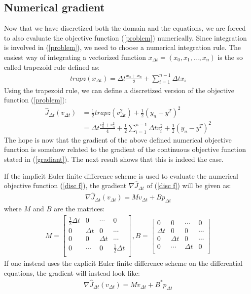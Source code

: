 \subsection{Numerical gradient}
Now that we have discretized both the domain and the equations, we are forced to also evaluate the objective function (\ref{problem}) numerically. Since integration is involved in (\ref{problem}), we need to choose a numerical integration rule. The easiest way of integrating a vectorized function $x_{\Delta t} = (x_0,x_1,...,x_n)$ is the so called trapezoid rule defined as:
\begin{align}
trapz(x_{\Delta t})=\Delta t\frac{x_0+x_n}{2} +\sum_{i=1}^{n-1} \Delta t x_i \label{trap}
\end{align}
Using the trapezoid rule, we can define a discretized version of the objective function (\ref{problem}):
\begin{align}
\hat J_{\Delta t}(v_{\Delta t})&=\frac{1}{2} trapz(v_{\Delta t}^2)+ \frac{1}{2}(y_n-y^T)^2 \\
&=\Delta t\frac{v_0^2+v_n^2}{4} + \frac{1}{2}\sum_{i=1}^{n-1} \Delta t v_i^2 + \frac{1}{2}(y_n-y^T)^2 \label{disc f}
\end{align}
The hope is now that the gradient of the above defined numerical objective function is somehow related to the gradient of the continuous objective function stated in (\ref{gradiant}). The next result shows that this is indeed the case. 
\begin{theorem}
If the implicit Euler finite difference scheme is used to evaluate the numerical objective function (\ref{disc f}), the gradient $\nabla \hat J_{\Delta t}$ of (\ref{disc f}) will be given as:
\begin{align}
\nabla \hat J_{\Delta t}(v_{\Delta t}) = Mv_{\Delta t} + Bp_{\Delta t} \label{num_grad}
\end{align}
where $M$ and $B$ are the matrices:
\begin{align*}
M=\left[ \begin{array}{cccc}
   \frac{1}{2}\Delta t & 0 & \cdots & 0 \\  
   0& \Delta t & 0 & \cdots \\ 
   0 &0 & \Delta t  & \cdots \\
   0 &\cdots &0 & \frac{1}{2}\Delta t   \\
   \end{array}  \right] 
,B = \left[ \begin{array}{cccc}
   0& 0 & \cdots & 0 \\  
   \Delta t& 0 & 0 & \cdots \\ 
   0 & \Delta t& 0  & \cdots \\
   0 &\cdots & \Delta t& 0   \\
   \end{array}  \right] 
\end{align*}
If one instead uses the explicit Euler finite difference scheme on the differential equations, the gradient will instead look like:
\begin{align*}
\nabla \hat J_{\Delta t}(v_{\Delta t}) = Mv_{\Delta t} + B^*p_{\Delta t}
\end{align*}
\end{theorem}
